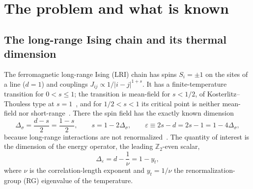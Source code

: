 \documentclass[10pt,a4paper]{article}
\newcommand{\Ds}{\Delta_\sigma}
\newcommand{\De}{\Delta_\varepsilon}
\begin{document}
\section{The problem and what is known}\label{sec:model}
\subsection{The long-range Ising chain and its thermal dimension}
The ferromagnetic long-range Ising (LRI) chain has spins $S_i=\pm1$ on the sites of a line ($d=1$) and couplings
$J_{ij}\propto1/|i-j|^{1+s}$. It has a finite-temperature transition for $0<s\le1$; the transition is mean-field for $s<1/2$, of
Kosterlitz--Thouless type at $s=1$~\cite{Kosterlitz1976,LM01}, and for $1/2<s<1$ its critical point is neither mean-field nor
short-range~\cite{Fisher1972,Sak1973}. There the spin field has the exactly known dimension
\begin{equation}
\Ds=\frac{d-s}{2}=\frac{1-s}{2},\qquad s=1-2\Ds,\qquad \varepsilon\equiv2s-d=2s-1=1-4\Ds ,\label{eq:ds}
\end{equation}
because long-range interactions are not renormalized~\cite{Sak1973}. The quantity of interest is the dimension of the energy
operator, the leading $\mathbb Z_2$-even scalar,
\begin{equation}
\De=d-\frac1\nu=1-y_t ,\label{eq:De}
\end{equation}
where $\nu$ is the correlation-length exponent and $y_t=1/\nu$ the renormalization-group (RG) eigenvalue of the temperature.
\end{document}
